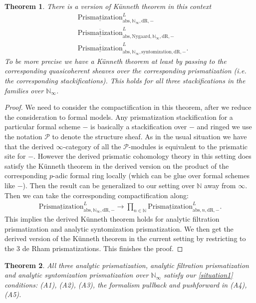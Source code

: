 \documentclass[12pt]{article}
\newtheorem{theorem}{Theorem}
\theoremstyle{definition}
\begin{document}
\begin{theorem}
There is a version of K\"unneth theorem in this context
\begin{align}
&\underline{\mathrm{Prismatization}}^L_{\mathrm{abs},\mathbb{N}_\infty,\mathrm{dR},-}\\
&\overline{\underline{\mathrm{Prismatization}}}^L_{\mathrm{abs},\mathrm{Nygaard},\mathbb{N}_\infty,\mathrm{dR},-}\\
&\overline{\underline{\mathrm{Prismatization}}}^L_{\mathrm{abs},\mathbb{N}_\infty,\mathrm{syntomization},\mathrm{dR},-}.
\end{align}
To be more precise we have a K\"unneth theorem at least by passing to the corresponding quasicoherent sheaves over the corresponding prismatization (i.e. the corresponding stackifications). This holds for all three stackifications in the families over $\mathbb{N}_\infty$. 
\end{theorem}

\begin{proof}
We need to consider the compactification in this theorem, after we reduce the consideration to formal models. Any prismatization stackification for a particular formal scheme $-$ is basically a stackification over $-$ and ringed we use the notation $\mathcal{P}$ to denote the structure sheaf. As in the usual situation we have that the derived $\infty$-category of all the $\mathcal{P}$-modules is equivalent to the prismatic site for $-$. However the derived prismatic cohomology theory in this setting does satisfy the K\"unneth theorem in the derived version on the product of the corresponding $p$-adic formal ring locally (which can be glue over formal schemes like $-$). Then the result can be generalized to our setting over $\mathbb{N}$ away from $\infty$. Then we can take the corresponding compactification along:
\begin{align}
{\underline{\mathrm{Prismatization}}}^L_{\mathrm{abs},\mathbb{N}_\infty,\mathrm{dR},-}\rightarrow  \prod_{n\in \mathbb{N}} {\underline{\mathrm{Prismatization}}}^L_{\mathrm{abs},n,\mathrm{dR},-}.
\end{align}
This implies the derived K\"unneth theorem holds for analytic filtration prismatization and analytic syntomization prismatization. We then get the derived version of the K\"unneth theorem in the current setting by restricting to the 3 de Rham prismatizations. This finishes the proof.
\end{proof}

\begin{theorem}
All three analytic prismatization, analytic filtration prismatization and analytic syntomization prismatization over $\mathbb{N}_\infty$ satisfy our \cref{situation1} conditions: (A1), (A2), (A3), the formalism pullback and pushforward in (A4), (A5).
\end{theorem}
\end{document}
